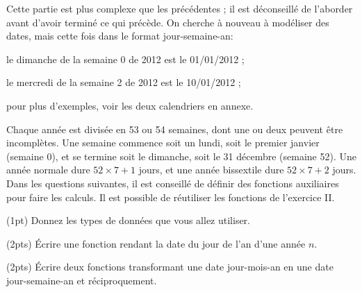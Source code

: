 

Cette partie est plus complexe que
les pr{\'e}c{\'e}dentes ; il est d{\'e}conseill{\'e} de l'aborder avant d'avoir termin{\'e}
ce qui pr{\'e}c{\`e}de. On cherche {\`a} nouveau {\`a} mod{\'e}liser des dates, mais cette
fois dans le format jour-semaine-an:
\begin{flist}
\item le dimanche de la semaine 0 de 2012 est le 01/01/2012 ;
\item le mercredi de la semaine 2 de 2012 est le 10/01/2012 ;
\item pour plus d'exemples, voir les deux calendriers en annexe.
\end{flist}
Chaque ann{\'e}e est divis{\'e}e en 53 ou 54 semaines, dont une ou deux
peuvent {\^e}tre incompl{\`e}tes. Une semaine commence soit un lundi, soit le
premier janvier (semaine 0), et se termine soit le dimanche, soit le
31 d{\'e}cembre (semaine 52).  Une ann{\'e}e normale dure $52\times 7 + 1$
jours, et une ann{\'e}e bissextile dure $52 \times 7 + 2$ jours. Dans les
questions suivantes, il est conseill{\'e} de d{\'e}finir des fonctions
auxiliaires pour faire les calculs. Il est possible de r{\'e}utiliser les
fonctions de l'exercice \textsc{II}.

\question (1pt) Donnez les types de donn{\'e}es que vous allez utiliser.

\question (2pts) {\'E}crire une fonction rendant la date du jour de l'an
d'une ann{\'e}e $n$.

\question (2pts) {\'E}crire deux fonctions transformant une date
jour-mois-an en une date jour-semaine-an et r{\'e}ciproquement.

